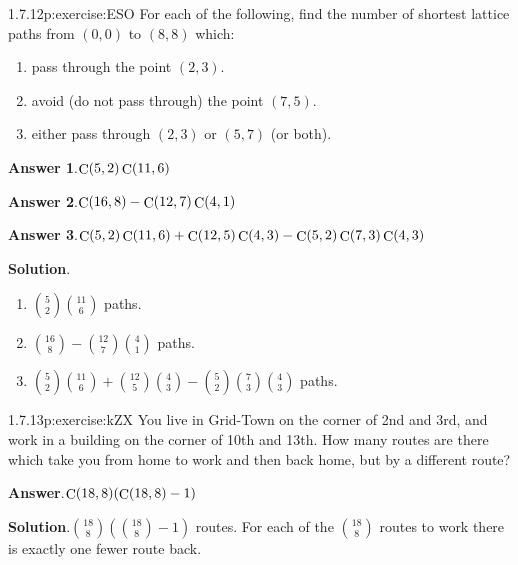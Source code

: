 \documentclass[twoside,11pt,]{book}
\newcommand{\blocktitlefont}{\relax}
\numberwithin{equation}{chapter}
\begin{document}
\begin{divisionsolution}{1.7.12}{}{p:exercise:ESO}%
For each of the following, find the number of shortest lattice paths from \((0,0)\) to \((8,8)\) which:%
\begin{enumerate}[label=(\alph*)]
\item{}pass through the point \((2,3)\text{.}\)%
\item{}avoid (do not pass through) the point \((7,5)\text{.}\)%
\item{}either pass through \((2,3)\) or \((5,7)\) (or both).%
\end{enumerate}
%
\par\smallskip%
\noindent\textbf{\blocktitlefont Answer 1}.\quad{}\(\mathop{\rm C}\nolimits\!\left(5,2\right)\mathop{\rm C}\nolimits\!\left(11,6\right)\)%
\par\smallskip%
\noindent\textbf{\blocktitlefont Answer 2}.\quad{}\(\mathop{\rm C}\nolimits\!\left(16,8\right)-\mathop{\rm C}\nolimits\!\left(12,7\right)\mathop{\rm C}\nolimits\!\left(4,1\right)\)%
\par\smallskip%
\noindent\textbf{\blocktitlefont Answer 3}.\quad{}\(\mathop{\rm C}\nolimits\!\left(5,2\right)\mathop{\rm C}\nolimits\!\left(11,6\right)+\mathop{\rm C}\nolimits\!\left(12,5\right)\mathop{\rm C}\nolimits\!\left(4,3\right)-\mathop{\rm C}\nolimits\!\left(5,2\right)\mathop{\rm C}\nolimits\!\left(7,3\right)\mathop{\rm C}\nolimits\!\left(4,3\right)\)%
\par\smallskip%
\noindent\textbf{\blocktitlefont Solution}.\quad{}%
\begin{enumerate}[label=(\alph*)]
\item{}\({5 \choose 2}{11 \choose 6}\) paths.%
\item{}\({16 \choose 8} - {12 \choose 7}{4 \choose 1}\) paths.%
\item{}\({5 \choose 2}{11 \choose 6} + {12 \choose 5}{4 \choose 3} - {5 \choose 2}{7 \choose 3}{4 \choose 3}\) paths.%
\end{enumerate}
%
\end{divisionsolution}%
\begin{divisionsolution}{1.7.13}{}{p:exercise:kZX}%
You live in Grid-Town on the corner of 2nd and 3rd, and work in a building on the corner of 10th and 13th. How many routes are there which take you from home to work and then back home, but by a different route?%
\par\smallskip%
\noindent\textbf{\blocktitlefont Answer}.\quad{}\(\mathop{\rm C}\nolimits\!\left(18,8\right)\!\left(\mathop{\rm C}\nolimits\!\left(18,8\right)-1\right)\)%
\par\smallskip%
\noindent\textbf{\blocktitlefont Solution}.\quad{}\({18 \choose 8}\left({18 \choose 8} - 1\right)\) routes. For each of the \(\binom{18}{8}\) routes to work there is exactly one fewer route back.%
\end{divisionsolution}%
\end{document}
